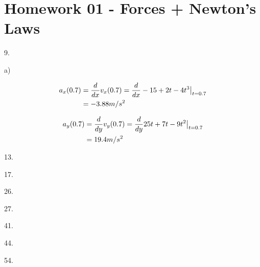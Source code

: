 \documentclass{scrreprt} %
\begin{document}
\section{Homework 01 - Forces + Newton's Laws}

9.

a)

\begin{align*}
	a_x(0.7) &= \frac{d}{dx}v_x(0.7) = \evalat{\frac{d}{dx}-15 + 2t - 4t^3}{t=0.7} \\
			 &= -3.88 m/s^2
\end{align*}

\begin{align*}
	a_y(0.7) &= \frac{d}{dy}v_y(0.7) = \evalat{\frac{d}{dy}25t + 7t - 9t^2}{t=0.7} \\
			 &= 19.4 m/s^2
\end{align*}



13.

17.

26.

27.

41.

44.

54.
\end{document}
